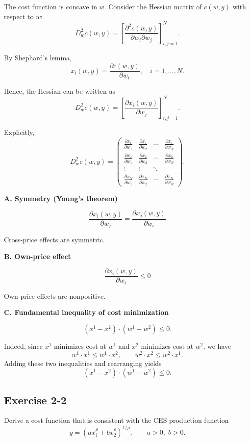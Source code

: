 The cost function is concave in $w$. Consider the Hessian matrix of $c(w,y)$ with respect to $w$:
\[
D_w^2 c(w,y)
=
\left[
\frac{\partial^2 c(w,y)}{\partial w_i \partial w_j}
\right]_{i,j=1}^N.
\]

By Shephard's lemma,
\[
x_i(w,y) = \frac{\partial c(w,y)}{\partial w_i}, \quad i=1,\dots,N.
\]

Hence, the Hessian can be written as
\[
D_w^2 c(w,y)
=
\left[
\frac{\partial x_i(w,y)}{\partial w_j}
\right]_{i,j=1}^N.
\]

Explicitly,
\[
D_w^2 c(w,y)
=
\begin{pmatrix}
\frac{\partial x_1}{\partial w_1} & \frac{\partial x_1}{\partial w_2} & \cdots & \frac{\partial x_1}{\partial w_N} \\
\frac{\partial x_2}{\partial w_1} & \frac{\partial x_2}{\partial w_2} & \cdots & \frac{\partial x_2}{\partial w_N} \\
\vdots & \vdots & \ddots & \vdots \\
\frac{\partial x_N}{\partial w_1} & \frac{\partial x_N}{\partial w_2} & \cdots & \frac{\partial x_N}{\partial w_N}
\end{pmatrix}.
\]

\textbf{A. Symmetry (Young’s theorem)}

\[
\frac{\partial x_i(w,y)}{\partial w_j}
=
\frac{\partial x_j(w,y)}{\partial w_i}
\]

Cross-price effects are symmetric.

\medskip

\textbf{B. Own-price effect}

\[
\frac{\partial x_i(w,y)}{\partial w_i} \le 0
\]

Own-price effects are nonpositive.



\textbf{C. Fundamental inequality of cost minimization}

\[
(x^1 - x^2)\cdot (w^1 - w^2) \le 0.
\]

Indeed, since $x^1$ minimizes cost at $w^1$ and $x^2$ minimizes cost at $w^2$,
we have
\[
w^1 \cdot x^1 \le w^1 \cdot x^2,
\qquad
w^2 \cdot x^2 \le w^2 \cdot x^1.
\]
Adding these two inequalities and rearranging yields
\[
(x^1 - x^2)\cdot (w^1 - w^2) \le 0.
\]

\begin{tcolorbox}[breakable]

\subsection*{Exercise 2-2}

Derive a cost function that is consistent with the CES production function
\[
y = \left(a x_1^{\rho} + b x_2^{\rho}\right)^{1/\rho},
\qquad a>0,\; b>0.
\]

\end{tcolorbox}

